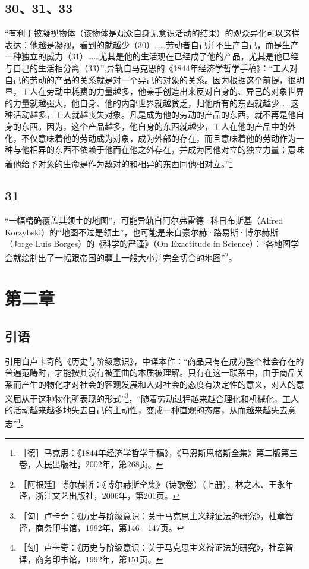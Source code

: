 \documentclass[fontset=fandol, a4paper, 12pt, openright]{ctexbook}
\begin{document}
\subsection*{30、31、33}
“有利于被凝视物体（该物体是观众自身无意识活动的结果）的观众异化可以这样表达：他越是凝视，看到的就越少（30）……劳动者自己并不生产自己，而是生产一种独立的威力（31）……尤其是他的生活现在已经成了他的产品，尤其是他已经与自己的生活相分离（33）”,异轨自马克思的《1844年经济学哲学手稿》：“工人对自己的劳动的产品的关系就是对一个异己的对象的关系。因为根据这个前提，很明显，工人在劳动中耗费的力量越多，他亲手创造出来反对自身的、异己的对象世界的力量就越强大，他自身、他的内部世界就越贫乏，归他所有的东西就越少……这种活动越多，工人就越丧失对象。凡是成为他的劳动的产品的东西，就不再是他自身的东西。因为，这个产品越多，他自身的东西就越少，工人在他的产品中的外化，不仅意味着他的劳动成为对象，成为外部的存在，而且意味着他的劳动作为一种与他相异的东西不依赖于他而在他之外存在，并成为同他对立的独立力量；意味着他给予对象的生命是作为敌对的和相异的东西同他相对立。”\footnote{［德］马克思：《1844年经济学哲学手稿》，《马恩斯恩格斯全集》第二版第三卷，人民出版社，2002年，第268页。}

\subsection*{31}
“一幅精确覆盖其领土的地图”，可能异轨自阿尔弗雷德·科日布斯基（Alfred Korzybski）的“地图不过是领土”，也可能是来自豪尔赫·路易斯·博尔赫斯（Jorge Luis Borges）的《科学的严谨》（On Exactitude in Science）：“各地图学会就绘制出了一幅跟帝国的疆土一般大小并完全切合的地图”\footnote{［阿根廷］博尔赫斯：《博尔赫斯全集》（诗歌卷）（上册），林之木、王永年译，浙江文艺出版社，2006年，第201页。}。

\section*{第二章}

\subsection*{引语}
引用自卢卡奇的《历史与阶级意识》，中译本作：“商品只有在成为整个社会存在的普遍范畴时，才能按其没有被歪曲的本质被理解。只有在这一联系中，由于商品关系而产生的物化才对社会的客观发展和人对社会的态度有决定性的意义，对人的意义屈从于这种物化所表现的形式”\footnote{［匈］卢卡奇：《历史与阶级意识：关于马克思主义辩证法的研究》，杜章智译，商务印书馆，1992年，第146—147页。}，“随着劳动过程越来越合理化和机械化，工人的活动越来越多地失去自己的主动性，变成一种直观的态度，从而越来越失去意志”\footnote{［匈］卢卡奇：《历史与阶级意识：关于马克思主义辩证法的研究》，杜章智译，商务印书馆，1992年，第151页。}。
\end{document}
